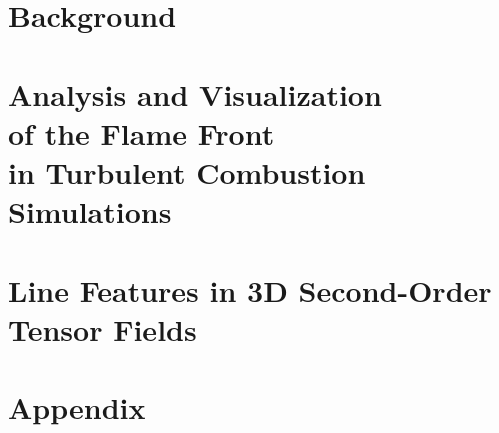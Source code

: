 
%
\part{Background} %
\label{part:background}
%

%

%
%
\part[Analysis and Visualization of the Flame Front
         in Turbulent Combustion Simulations]
        {Analysis and Visualization\\of the Flame Front\\
         in Turbulent Combustion Simulations} %
\label{part:flame_vis}
%

%

%

%
%
\part[Line Features in 3D Second-Order Tensor Fields]
    {Line Features in 3D Second-Order\\Tensor Fields} %
\label{part:tensor_vis}
%

%

%

%
%
\part{Appendix}
\label{part:appendix}
%
\appendix
%

%

%